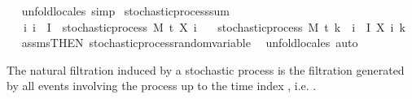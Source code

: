 \begin{isabellebody}
\isadelimproof
\ %
\endisadelimproof
%
\isatagproof
{}\isamarkupfalse%
\ {\isacharparenleft}{\kern0pt}unfold{\isacharunderscore}{\kern0pt}locales{\isacharparenright}{\kern0pt}\ simp%
\endisatagproof
{\isafoldproof}%
%
\isadelimproof
%
\endisadelimproof
\isanewline
\isanewline
{}\isamarkupfalse%
\isanewline
\isanewline
{}\isamarkupfalse%
\ stochastic{\isacharunderscore}{\kern0pt}process{\isacharunderscore}{\kern0pt}sum{\isacharcolon}{\kern0pt}\isanewline
\ \ \ {\isachardoublequoteopen}{\isasymAnd}i{\isachardot}{\kern0pt}\ i\ {\isasymin}\ I\ {\isasymLongrightarrow}\ stochastic{\isacharunderscore}{\kern0pt}process\ M\ t\ {\isacharparenleft}{\kern0pt}X\ i{\isacharparenright}{\kern0pt}{\isachardoublequoteclose}\isanewline
\ \ \ {\isachardoublequoteopen}stochastic{\isacharunderscore}{\kern0pt}process\ M\ t\ {\isacharparenleft}{\kern0pt}{\isasymlambda}k\ {\isasymxi}{\isachardot}{\kern0pt}\ {\isasymSum}i\ {\isasymin}\ I{\isachardot}{\kern0pt}\ X\ i\ k\ {\isasymxi}{\isacharparenright}{\kern0pt}{\isachardoublequoteclose}%
\isadelimproof
\ %
\endisadelimproof
%
\isatagproof
{}\isamarkupfalse%
\ assms{\isacharbrackleft}{\kern0pt}THEN\ stochastic{\isacharunderscore}{\kern0pt}process{\isachardot}{\kern0pt}random{\isacharunderscore}{\kern0pt}variable{\isacharbrackright}{\kern0pt}\ \isamarkupfalse%
\ {\isacharparenleft}{\kern0pt}unfold{\isacharunderscore}{\kern0pt}locales{\isacharcomma}{\kern0pt}\ auto{\isacharparenright}{\kern0pt}%
\endisatagproof
{\isafoldproof}%
%
\isadelimproof
%
\endisadelimproof
%
\isadelimdocument
%
\endisadelimdocument
%
\isatagdocument
%
\isamarkuptrue%
%
\endisatagdocument
{\isafolddocument}%
%
\isadelimdocument
%
\endisadelimdocument
%
\begin{isamarkuptext}%
The natural filtration induced by a stochastic process  is the filtration generated by all events involving the process up to the time index , i.e. .%
\end{isamarkuptext}\isamarkuptrue%
\isamarkupfalse%

\end{isabellebody}
